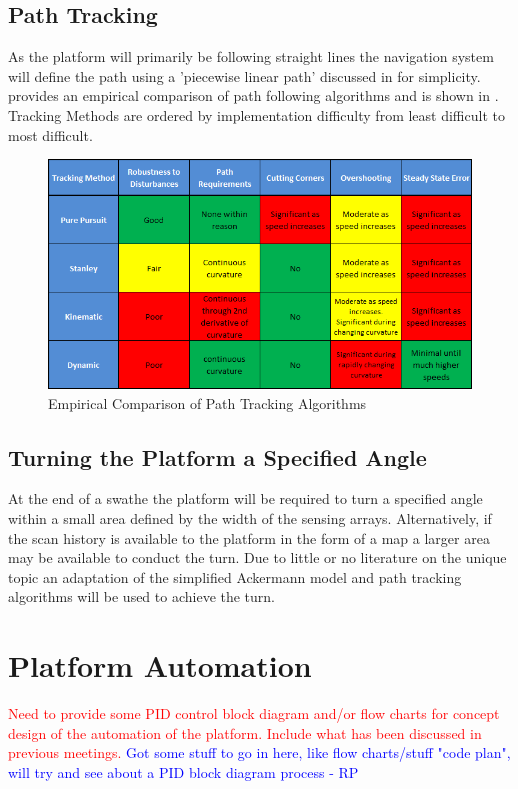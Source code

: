 \documentclass[main.tex]{subfiles}
\begin{document}
\subsection{Path Tracking}
As the platform will primarily be following straight lines the navigation system will define the path using a 'piecewise linear path' discussed in  for simplicity.
\Textcite{snider2009} provides an empirical comparison of path following algorithms and is shown in . Tracking Methods are ordered by implementation difficulty from least difficult to most difficult.
\begin{figure}[ht]
\includegraphics[width = \textwidth]{4-ConceptDesign/pathTrackingSummary2.png}
\centering
\caption[Empirical Comparison of Path Tracking Algorithms]{Empirical Comparison of Path Tracking Algorithms \parencite{snider2009}} 
\end{figure}

\subsection{Turning the Platform a Specified Angle}
At the end of a swathe the platform will be required to turn a specified angle within a small area defined by the width of the sensing arrays. Alternatively, if the scan history is available to the platform in the form of a map a larger area may be available to conduct the turn. Due to little or no literature on the unique topic an adaptation of the simplified Ackermann model and path tracking algorithms will be used to achieve the turn.

\section{Platform Automation}
\textcolor{red}{Need to provide some PID control block diagram and/or flow charts for concept design of the automation of the platform. Include what has been discussed in previous meetings.}
\textcolor{blue}{Got some stuff to go in here, like flow charts/stuff "code plan", will try and see about a PID block diagram process - RP}
\end{document}
